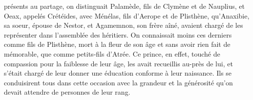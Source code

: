 \documentclass{article}
\begin{document}
présents au partage, on distinguait Palamède, fils de Clymène et de Nauplius, et Oeax, appelés Crétéides, avec Ménélas, fils d'Ae\-ro\-pe et de Plisthène, qu'Anaxibie, sa soeur, épouse de Nestor, et Agamemnon, son frère aîné, avaient chargé de les représenter dans l'assemblée des héritiers. On connaissait moins ces derniers comme fils de Plisthène, mort à la fleur de son âge et sans avoir rien fait de mémorable, que comme petits-fils d'Atrée. Ce prince, en effet, touché de compassion pour la faiblesse de leur âge, les avait recueillis au-près de lui, et s'était chargé de leur donner une éducation conforme à leur naissance. Ils se conduisirent tous dans cette occasion avec la grandeur et la générosité qu'on devait attendre de personnes de leur rang.
 \pend
 \pstart
\end{document}
